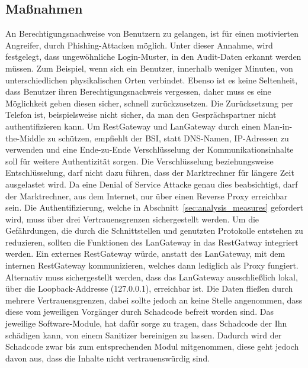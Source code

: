 \documentclass[11pt,a4paper]{report}
\begin{document}
\subsection{Maßnahmen}

An Berechtigungsnachweise von Benutzern zu gelangen, ist für einen motivierten Angreifer, durch Phishing-Attacken möglich. Unter dieser Annahme, wird festgelegt, dass ungewöhnliche Login-Muster, in den Audit-Daten erkannt werden müssen. Zum Beispiel, wenn sich ein Benutzer, innerhalb weniger Minuten, von unterschiedlichen physikalischen Orten verbindet. Ebenso ist es keine Seltenheit, dass Benutzer ihren Berechtigungsnachweis vergessen, daher muss es eine Möglichkeit geben diesen sicher, schnell zurückzusetzen. Die Zurücksetzung per Telefon ist, beispielsweise nicht sicher, da man den Gesprächspartner nicht authentifizieren kann. Um RestGateway und LanGateway durch einen Man-in-the-Middle zu schützen, empfiehlt der BSI, statt DNS-Namen, IP-Adressen zu verwenden \cite{bsi_m559} und eine Ende-zu-Ende Verschlüsselung der Kommunikationsinhalte soll für weitere Authentizität sorgen. Die Verschlüsselung beziehungsweise Entschlüsselung, darf nicht dazu führen, dass der Marktrechner für längere Zeit ausgelastet wird. Da eine Denial of Service Attacke genau dies beabsichtigt, darf der Marktrechner, aus dem Internet, nur über einen Reverse Proxy erreichbar sein. Die Authentifizierung, welche in Abschnitt~\ref{sec:analysis_measures} gefordert wird, muss über drei Vertrauensgrenzen sichergestellt werden. Um die Gefährdungen, die durch die Schnittstellen und genutzten Protokolle entstehen zu reduzieren, sollten die Funktionen des LanGateway in das RestGatway integriert werden. Ein externes RestGateway würde, anstatt des LanGateway, mit dem internen RestGateway kommunizieren, welches dann lediglich als Proxy fungiert. Alternativ muss sichergestellt werden, dass das LanGateway ausschließlich lokal, über die Loopback-Addresse (127.0.0.1), erreichbar ist. Die Daten fließen durch mehrere Vertrauensgrenzen, dabei sollte jedoch an keine Stelle angenommen, dass diese vom jeweiligen Vorgänger durch Schadcode befreit worden sind. Das jeweilige Software-Module, hat dafür sorge zu tragen, dass Schadcode der Ihn schädigen kann, von einem Sanitizer bereinigen zu lassen. Dadurch wird der Schadcode zwar bis zum entsprechenden Modul mitgenommen, diese geht jedoch davon aus, dass die Inhalte nicht vertrauenswürdig sind.

\end{document}
